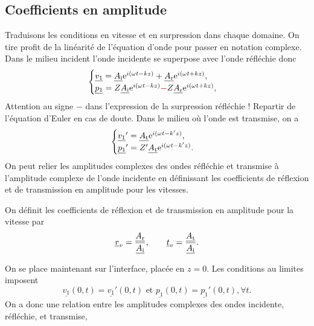 \documentclass[12pt,fancy]{cours}%
\begin{document}
\subsection{Coefficients en amplitude}
Traduisons les conditions en vitesse et en surpression dans chaque domaine. On tire profit de la linéarité de l'équation d'onde pour passer en notation complexe. Dans le milieu incident l'onde incidente se superpose avec l'onde réfléchie donc
\begin{equation}
\begin{cases}
\underline{v_1}=\underline{A_{\rm{i}}}\e^{i(\omega t- kz)} + \underline{A_{\rm{r}}}\e^{i(\omega t+kz)},\\
\underline{p_1}=Z\underline{A_{\rm{i}}}\e^{i(\omega t-kz)} \JRouge{-}Z \underline{A_{\rm{r}}}\e^{i(\omega t+kz)},
\end{cases}
\end{equation}
Attention au signe $-$ dans l'expression de la surpression réfléchie ! Repartir de l'équation d'Euler en cas de doute. Dans le milieu où l'onde est transmise, on a
\begin{equation}
\begin{cases}
\underline{v_1}'=\underline{A_{\rm{t}}}\mathrm{e}^{i(\omega t-k'z)},\\
\underline{p_1}'=Z'\underline{A_{\rm{t}}}\mathrm{e}^{i(\omega t-k'z)}.
\end{cases}
\end{equation}
On peut relier les amplitudes complexes des ondes réfléchie et transmise à l'amplitude complexe de l'onde incidente en définissant les coefficients de réflexion et de transmission en amplitude pour les vitesses.
\begin{definition}\label{def:}
On définit les coefficients de réflexion et de transmission en amplitude pour la vitesse par
\begin{equation*}
\underline{r}_{v}=\frac{\underline{A_{\rm{r}}}}{\underline{A_{\rm{i}}}}, \qquad
\underline{t}_{v}=\frac{\underline{A_{\rm{t}}}}{\underline{A_{\rm{i}}}}.
\end{equation*}
\end{definition}
On se place maintenant sur l'interface, placée en $z=0$. Les conditions au limites imposent
\begin{equation}
	\underline{v_{1}}(0 ,t)=\underline{v_{1}}'(0 ,t) \text{ et } \underline{p_1}(0,t)=\underline{p_1}'(0,t), \forall t.
\end{equation}  On a donc une relation entre les amplitudes complexes des ondes incidente, réfléchie, et transmise,
\end{document}
